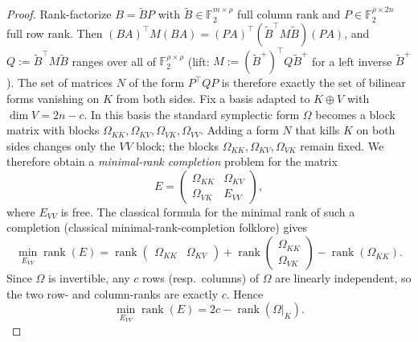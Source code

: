 \documentclass[11pt,a4paper]{article}
\theoremstyle{plain}
\theoremstyle{definition}
\newcommand{\F}{\mathbb{F}}
\begin{document}
\begin{proof}
Rank-factorize $B = \tilde{B} P$ with $\tilde{B} \in \F_2^{m \times \rho}$ full column rank and $P \in \F_2^{\rho \times 2n}$ full row rank. Then $(BA)^{\top} M (BA) = (PA)^{\top} (\tilde{B}^{\top} M \tilde{B}) (PA)$, and $Q := \tilde{B}^{\top} M \tilde{B}$ ranges over all of $\F_2^{\rho \times \rho}$ (lift: $M := (\tilde{B}^{+})^{\top} Q \tilde{B}^{+}$ for a left inverse $\tilde{B}^{+}$). The set of matrices $N$ of the form $P^{\top}QP$ is therefore exactly the set of bilinear forms vanishing on $K$ from both sides. Fix a basis adapted to $K \oplus V$ with $\dim V = 2n-c$. In this basis the standard symplectic form $\Omega$ becomes a block matrix with blocks $\Omega_{KK}, \Omega_{KV}, \Omega_{VK}, \Omega_{VV}$. Adding a form $N$ that kills $K$ on both sides changes only the $VV$ block; the blocks $\Omega_{KK}, \Omega_{KV}, \Omega_{VK}$ remain fixed. We therefore obtain a \emph{minimal-rank completion} problem for the matrix
\[
E = \begin{pmatrix} \Omega_{KK} & \Omega_{KV} \\ \Omega_{VK} & E_{VV} \end{pmatrix},
\]
where $E_{VV}$ is free. The classical formula for the minimal rank of such a completion (classical minimal-rank-completion folklore) gives
\[
\min_{E_{VV}} \operatorname{rank}(E)
= \operatorname{rank}\begin{pmatrix} \Omega_{KK} & \Omega_{KV} \end{pmatrix}
+ \operatorname{rank}\begin{pmatrix} \Omega_{KK} \\ \Omega_{VK} \end{pmatrix}
- \operatorname{rank}(\Omega_{KK}).
\]
Since $\Omega$ is invertible, any $c$ rows (resp.\ columns) of $\Omega$ are linearly independent, so the two row- and column-ranks are exactly $c$. Hence
\[
\min_{E_{VV}} \operatorname{rank}(E) = 2c - \operatorname{rank}(\Omega|_K).
\]

\end{proof}
\end{document}
